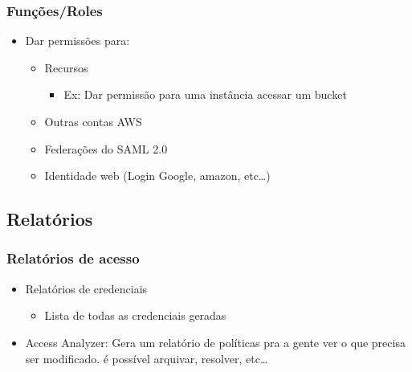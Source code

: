 \begin{frame}
	\frametitle{Funções/Roles}
	\begin{itemize}
		\item Dar permissões para:
			\begin{itemize}
				\item Recursos
				\begin{itemize}
					\item Ex: Dar permissão para uma instância acessar um bucket
				\end{itemize}
				\item Outras contas AWS
				\item Federações do SAML 2.0
				\item Identidade web (Login Google, amazon, etc\dots)
			\end{itemize}
	\end{itemize}
\end{frame}

\subsection{Relatórios}

\begin{frame}
	\frametitle{Relatórios de acesso}
	\begin{itemize}
		\item Relatórios de credenciais
			\begin{itemize}
				\item Lista de todas as credenciais geradas
			\end{itemize}
		\item Access Analyzer: Gera um relatório de políticas pra a gente ver o que precisa ser modificado. é possível arquivar, resolver, etc\dots
	\end{itemize}
\end{frame}
